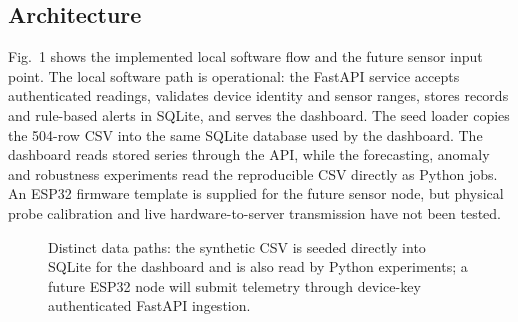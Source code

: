 \documentclass[10pt,letterpaper,twocolumn]{article}
\begin{document}
\subsection{Architecture}
Fig.~1 shows the implemented local software flow and the future sensor input point. The local software path is operational: the FastAPI service accepts authenticated readings, validates device identity and sensor ranges, stores records and rule-based alerts in SQLite, and serves the dashboard. The seed loader copies the 504-row CSV into the same SQLite database used by the dashboard. The dashboard reads stored series through the API, while the forecasting, anomaly and robustness experiments read the reproducible CSV directly as Python jobs. An ESP32 firmware template is supplied for the future sensor node, but physical probe calibration and live hardware-to-server transmission have not been tested.

\begin{figure}[t]
\centering
{}
\caption{Distinct data paths: the synthetic CSV is seeded directly into SQLite for the dashboard and is also read by Python experiments; a future ESP32 node will submit telemetry through device-key authenticated FastAPI ingestion.}
\end{figure}
\end{document}
